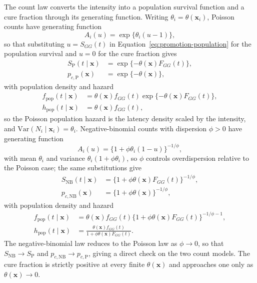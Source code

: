 {The count law converts the intensity into a population survival function and a cure fraction through its generating function. Writing $\theta_i=\theta(\bm{x}_i)$, Poisson counts have generating function
\begin{equation*}
A_i(u)=\exp\{\theta_i(u-1)\},
\end{equation*}
so that substituting $u=S_{GG}(t)$ in Equation~\eqref{eq:promotion-population} for the population survival and $u=0$ for the cure fraction gives
\begin{equation}
\begin{aligned}
S_{\mathrm{P}}(t\mid\bm{x})
&=\exp\{-\theta(\bm{x})F_{GG}(t)\},\\
p_{c,\mathrm{P}}(\bm{x})
&=\exp\{-\theta(\bm{x})\},
\end{aligned}
\label{eq:poisson-survival-cure}
\end{equation}
with population density and hazard
\begin{equation*}
\begin{aligned}
f_{\mathrm{pop}}(t\mid\bm{x})
&=\theta(\bm{x})f_{GG}(t)\exp\{-\theta(\bm{x})F_{GG}(t)\},\\
h_{\mathrm{pop}}(t\mid\bm{x})
&=\theta(\bm{x})f_{GG}(t),
\end{aligned}
\end{equation*}
so the Poisson population hazard is the latency density scaled by the intensity, and $\mathrm{Var}(N_i\mid\bm{x}_i)=\theta_i$. Negative-binomial counts with dispersion $\phi>0$ have generating function
\begin{equation*}
A_i(u)=\{1+\phi\theta_i(1-u)\}^{-1/\phi},
\end{equation*}
with mean $\theta_i$ and variance $\theta_i(1+\phi\theta_i)$, so $\phi$ controls overdispersion relative to the Poisson case; the same substitutions give
\begin{equation}
\begin{aligned}
S_{\mathrm{NB}}(t\mid\bm{x})
&=\{1+\phi\theta(\bm{x})F_{GG}(t)\}^{-1/\phi},\\
p_{c,\mathrm{NB}}(\bm{x})
&=\{1+\phi\theta(\bm{x})\}^{-1/\phi},
\end{aligned}
\label{eq:nb-survival-cure}
\end{equation}
with population density and hazard
\begin{equation*}
\begin{aligned}
f_{\mathrm{pop}}(t\mid\bm{x})
&=\theta(\bm{x})f_{GG}(t)\{1+\phi\theta(\bm{x})F_{GG}(t)\}^{-1/\phi-1},\\
h_{\mathrm{pop}}(t\mid\bm{x})
&=\frac{\theta(\bm{x})f_{GG}(t)}{1+\phi\theta(\bm{x})F_{GG}(t)}.
\end{aligned}
\end{equation*}
The negative-binomial law reduces to the Poisson law as $\phi\to0$, so that $S_{\mathrm{NB}}\to S_{\mathrm{P}}$ and $p_{c,\mathrm{NB}}\to p_{c,\mathrm{P}}$, giving a direct check on the two count models. The cure fraction is strictly positive at every finite $\theta(\bm{x})$ and approaches one only as $\theta(\bm{x})\to0$.}

